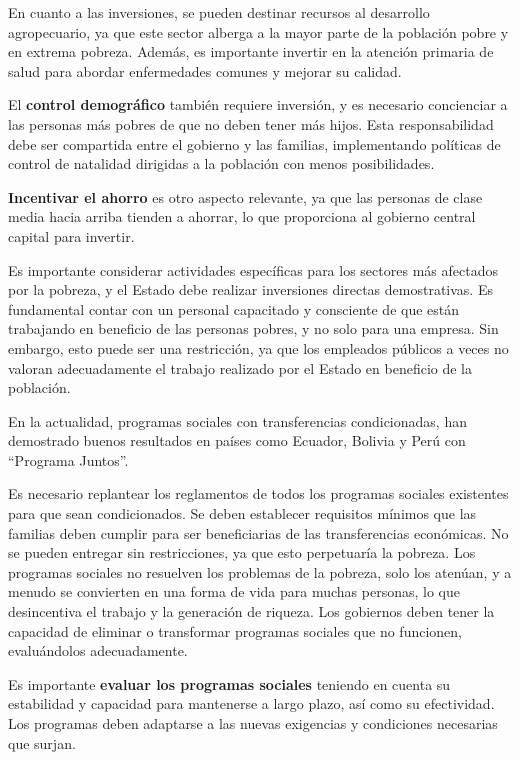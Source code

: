 \documentclass[
  jou,
  floatsintext,
  longtable,
  a4paper,
  nolmodern,
  notxfonts,
  notimes,
  12pt,
  colorlinks=true,linkcolor=blue,citecolor=blue,urlcolor=blue]{apa7}
\begin{document}
En cuanto a las inversiones, se pueden destinar recursos al desarrollo
agropecuario, ya que este sector alberga a la mayor parte de la
población pobre y en extrema pobreza. Además, es importante invertir en
la atención primaria de salud para abordar enfermedades comunes y
mejorar su calidad.

El \textbf{control demográfico} también requiere inversión, y es
necesario concienciar a las personas más pobres de que no deben tener
más hijos. Esta responsabilidad debe ser compartida entre el gobierno y
las familias, implementando políticas de control de natalidad dirigidas
a la población con menos posibilidades.

\textbf{Incentivar el ahorro} es otro aspecto relevante, ya que las
personas de clase media hacia arriba tienden a ahorrar, lo que
proporciona al gobierno central capital para invertir.

Es importante considerar actividades específicas para los sectores más
afectados por la pobreza, y el Estado debe realizar inversiones directas
demostrativas. Es fundamental contar con un personal capacitado y
consciente de que están trabajando en beneficio de las personas pobres,
y no solo para una empresa. Sin embargo, esto puede ser una restricción,
ya que los empleados públicos a veces no valoran adecuadamente el
trabajo realizado por el Estado en beneficio de la población.

En la actualidad, programas sociales con transferencias condicionadas,
han demostrado buenos resultados en países como Ecuador, Bolivia y Perú
con ``Programa Juntos''.

Es necesario replantear los reglamentos de todos los programas sociales
existentes para que sean condicionados. Se deben establecer requisitos
mínimos que las familias deben cumplir para ser beneficiarias de las
transferencias económicas. No se pueden entregar sin restricciones, ya
que esto perpetuaría la pobreza. Los programas sociales no resuelven los
problemas de la pobreza, solo los atenúan, y a menudo se convierten en
una forma de vida para muchas personas, lo que desincentiva el trabajo y
la generación de riqueza. Los gobiernos deben tener la capacidad de
eliminar o transformar programas sociales que no funcionen, evaluándolos
adecuadamente.

Es importante \textbf{evaluar los programas sociales} teniendo en cuenta
su estabilidad y capacidad para mantenerse a largo plazo, así como su
efectividad. Los programas deben adaptarse a las nuevas exigencias y
condiciones necesarias que surjan.
\end{document}
